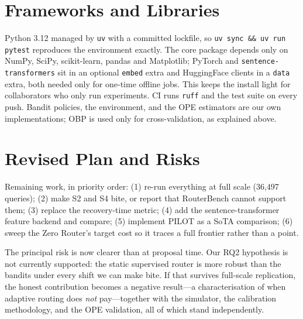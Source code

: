 \documentclass[10pt,twocolumn]{article}
\begin{document}
\section{Frameworks and Libraries}

Python 3.12 managed by \texttt{uv} with a committed lockfile, so
\texttt{uv sync \&\& uv run pytest} reproduces the environment exactly. The core
package depends only on NumPy, SciPy, scikit-learn, pandas and Matplotlib;
PyTorch and \texttt{sentence-transformers} sit in an optional \texttt{embed}
extra and HuggingFace clients in a \texttt{data} extra, both needed only for
one-time offline jobs. This keeps the install light for collaborators who only
run experiments. CI runs \texttt{ruff} and the test suite on every push.
Bandit policies, the environment, and the OPE estimators are our own
implementations; OBP is used only for cross-validation, as explained above.

\section{Revised Plan and Risks}

Remaining work, in priority order: (1) re-run everything at full scale
(36{,}497 queries); (2) make S2 and S4 bite, or report that RouterBench cannot
support them; (3) replace the recovery-time metric; (4) add the
sentence-transformer feature backend and compare; (5) implement PILOT as a SoTA
comparison; (6) sweep the Zero Router's target cost so it traces a full frontier
rather than a point.

The principal risk is now clearer than at proposal time. Our RQ2 hypothesis is
not currently supported: the static supervised router is more robust than the
bandits under every shift we can make bite. If that survives full-scale
replication, the honest contribution becomes a negative result---a
characterisation of when adaptive routing does \emph{not} pay---together with
the simulator, the calibration methodology, and the OPE validation, all of which
stand independently.
\end{document}
